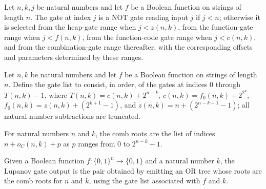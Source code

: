 \begin{definition}
\label{BoolCircuit.Lupanov.gateAt}
\leanok
{}
Let $n,k,j$ be natural numbers and let $f$ be a Boolean function on strings of length
$n$. The gate at index $j$ is a NOT gate reading input $j$ if $j<n$; otherwise it is
selected from the heap-gate range when $j<z(n,k)$, from the function-gate range when
$j<f(n,k)$, from the function-code gate range when $j<c(n,k)$, and from the
combination-gate range thereafter, with the corresponding offsets and parameters
determined by these ranges.
\end{definition}

\begin{definition}
\label{BoolCircuit.Lupanov.gates}
\leanok
{}
Let $n,k$ be natural numbers and let $f$ be a Boolean function on strings of length $n$.
Define the gate list to consist, in order, of the gates at indices $0$ through
$T(n,k)-1$, where $T(n,k)=c(n,k)+2^{n-k}$, $c(n,k)=f_0(n,k)+2^{2^k}$,
$f_0(n,k)=z(n,k)+(2^{k+1}-1)$, and $z(n,k)=n+(2^{n-k+1}-1)$; all natural-number
subtractions are truncated.
\end{definition}

\begin{definition}
\label{BoolCircuit.Lupanov.combRoots}
\leanok
{}
For natural numbers $n$ and $k$, the comb roots are the list of indices $n + o_C(n,k) +
p$ as $p$ ranges from $0$ to $2^{n-k}-1$.
\end{definition}

\begin{definition}
\label{BoolCircuit.Lupanov.lupGates}
\leanok
{}
Given a Boolean function $f : \{0,1\}^n \to \{0,1\}$ and a natural number $k$, the
Lupanov gate output is the pair obtained by emitting an OR tree whose roots are the comb
roots for $n$ and $k$, using the gate list associated with $f$ and $k$.
\end{definition}

